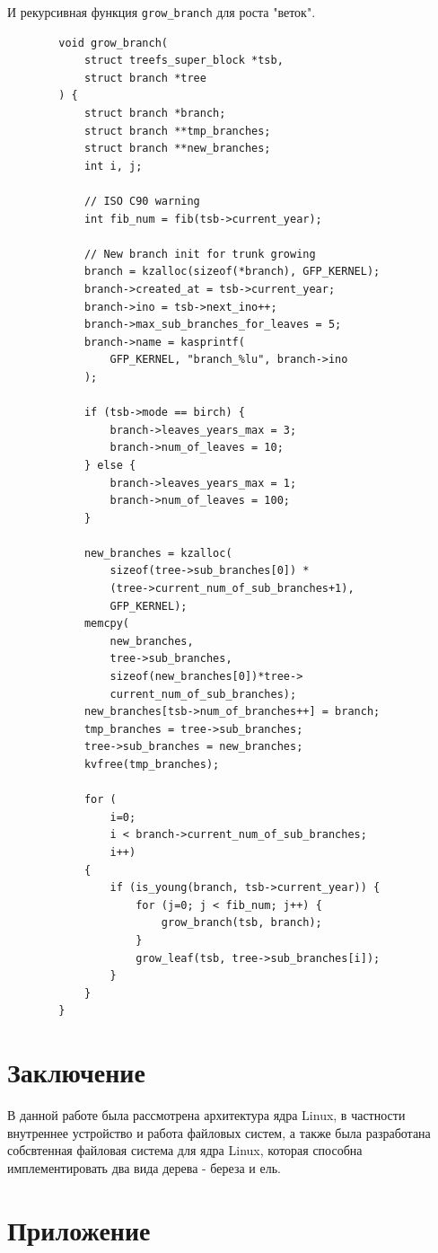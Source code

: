 \documentclass{article}
\begin{document}
    И рекурсивная функция \texttt{grow\_branch} для роста "веток".
    \begin{lstlisting}
        void grow_branch(
            struct treefs_super_block *tsb, 
            struct branch *tree
        ) {
            struct branch *branch;
            struct branch **tmp_branches;
            struct branch **new_branches;
            int i, j;

            // ISO C90 warning
            int fib_num = fib(tsb->current_year);

            // New branch init for trunk growing
            branch = kzalloc(sizeof(*branch), GFP_KERNEL);
            branch->created_at = tsb->current_year;
            branch->ino = tsb->next_ino++;
            branch->max_sub_branches_for_leaves = 5;
            branch->name = kasprintf(
                GFP_KERNEL, "branch_%lu", branch->ino
            );

            if (tsb->mode == birch) {
                branch->leaves_years_max = 3;
                branch->num_of_leaves = 10;
            } else {
                branch->leaves_years_max = 1;
                branch->num_of_leaves = 100;
            }

            new_branches = kzalloc(
                sizeof(tree->sub_branches[0]) * 
                (tree->current_num_of_sub_branches+1), 
                GFP_KERNEL);
            memcpy(
                new_branches, 
                tree->sub_branches, 
                sizeof(new_branches[0])*tree->
                current_num_of_sub_branches);
            new_branches[tsb->num_of_branches++] = branch;
            tmp_branches = tree->sub_branches;
            tree->sub_branches = new_branches;
            kvfree(tmp_branches);

            for (
                i=0; 
                i < branch->current_num_of_sub_branches; 
                i++) 
            {
                if (is_young(branch, tsb->current_year)) {
                    for (j=0; j < fib_num; j++) {
                        grow_branch(tsb, branch);
                    }
                    grow_leaf(tsb, tree->sub_branches[i]);
                }
            }
        }
    \end{lstlisting}

    \newpage
    \section{Заключение}
    В данной работе была рассмотрена архитектура ядра Linux, в частности
    внутреннее устройство и работа файловых систем, а также была разработана
    собсвтенная файловая система для ядра Linux, которая способна имплементировать
    два вида дерева - береза и ель.

    \newpage

    \begin{thebibliography}{99}
    \end{thebibliography}

    \newpage

    \section{Приложение}
\end{document}

